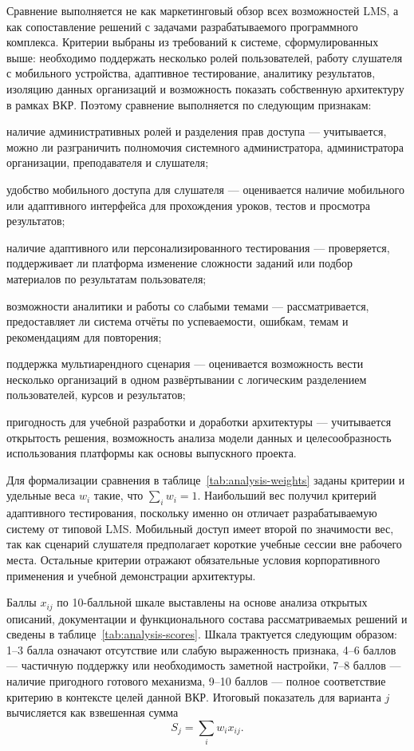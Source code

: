 Сравнение выполняется не как маркетинговый обзор всех возможностей LMS, а как сопоставление решений с задачами разрабатываемого программного комплекса. Критерии выбраны из требований к системе, сформулированных выше: необходимо поддержать несколько ролей пользователей, работу слушателя с мобильного устройства, адаптивное тестирование, аналитику результатов, изоляцию данных организаций и возможность показать собственную архитектуру в рамках ВКР. Поэтому сравнение выполняется по следующим признакам:
\begin{parenlist}
  \item наличие административных ролей и разделения прав доступа --- учитывается, можно ли разграничить полномочия системного администратора, администратора организации, преподавателя и слушателя;
  \item удобство мобильного доступа для слушателя --- оценивается наличие мобильного или адаптивного интерфейса для прохождения уроков, тестов и просмотра результатов;
  \item наличие адаптивного или персонализированного тестирования --- проверяется, поддерживает ли платформа изменение сложности заданий или подбор материалов по результатам пользователя;
  \item возможности аналитики и работы со слабыми темами --- рассматривается, предоставляет ли система отчёты по успеваемости, ошибкам, темам и рекомендациям для повторения;
  \item поддержка мультиарендного сценария --- оценивается возможность вести несколько организаций в одном развёртывании с логическим разделением пользователей, курсов и результатов;
  \item пригодность для учебной разработки и доработки архитектуры --- учитывается открытость решения, возможность анализа модели данных и целесообразность использования платформы как основы выпускного проекта.
\end{parenlist}

Для формализации сравнения в таблице~\ref{tab:analysis-weights} заданы критерии и удельные веса $w_i$ такие, что $\sum_i w_i = 1$. Наибольший вес получил критерий адаптивного тестирования, поскольку именно он отличает разрабатываемую систему от типовой LMS. Мобильный доступ имеет второй по значимости вес, так как сценарий слушателя предполагает короткие учебные сессии вне рабочего места. Остальные критерии отражают обязательные условия корпоративного применения и учебной демонстрации архитектуры.

Баллы $x_{ij}$ по 10-балльной шкале выставлены на основе анализа открытых описаний, документации и функционального состава рассматриваемых решений и сведены в таблице~\ref{tab:analysis-scores}. Шкала трактуется следующим образом: 1--3 балла означают отсутствие или слабую выраженность признака, 4--6 баллов --- частичную поддержку или необходимость заметной настройки, 7--8 баллов --- наличие пригодного готового механизма, 9--10 баллов --- полное соответствие критерию в контексте целей данной ВКР. Итоговый показатель для варианта $j$ вычисляется как взвешенная сумма\cite{gost7052008}
\begin{equation}
S_j = \sum_i w_i x_{ij}.
\label{eq:analysis-score}
\end{equation}

